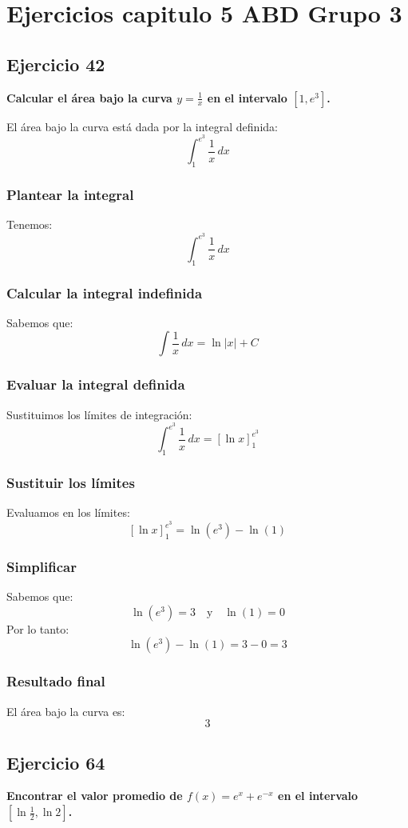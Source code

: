 \chapter*{Ejercicios capitulo 5 ABD Grupo 3}

\section*{Ejercicio 42}
\textbf{Calcular el área bajo la curva \( y = \frac{1}{x} \) en el intervalo \([1, e^3]\).}

El área bajo la curva está dada por la integral definida:
\[
\int_{1}^{e^3} \frac{1}{x} \, dx
\]

\subsection*{Plantear la integral}
Tenemos:
\[
\int_{1}^{e^3} \frac{1}{x} \, dx
\]

\subsection*{Calcular la integral indefinida}
Sabemos que:
\[
\int \frac{1}{x} \, dx = \ln|x| + C
\]

\subsection*{Evaluar la integral definida}
Sustituimos los límites de integración:
\[
\int_{1}^{e^3} \frac{1}{x} \, dx = \left[ \ln x \right]_{1}^{e^3}
\]

\subsection*{Sustituir los límites}
Evaluamos en los límites:
\[
\left[ \ln x \right]_{1}^{e^3} = \ln(e^3) - \ln(1)
\]

\subsection*{Simplificar}
Sabemos que:
\[
\ln(e^3) = 3 \quad \text{y} \quad \ln(1) = 0
\]
Por lo tanto:
\[
\ln(e^3) - \ln(1) = 3 - 0 = 3
\]

\subsection*{Resultado final}
El área bajo la curva es:
\[
\boxed{3}
\]
\newpage

\section*{Ejercicio 64}
\textbf{Encontrar el valor promedio de \( f(x) = e^x + e^{-x} \) en el intervalo \([ \ln \frac{1}{2}, \ln 2 ]\).}

